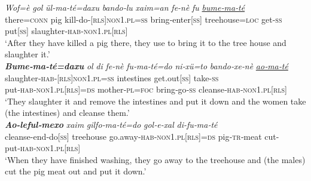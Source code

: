 \documentclass[output=paper]{LSP/langsci}
\begin{document}
\begin{exe}
\ex \label{Devex:09ac}
\begin{xlist}
\ex \label{Devex:09a}		
\gll \textit{Wof=è}  \textit{gol}  \textit{ül-ma‑té=daxu} \textit{bando‑lu} \textit{xaim=an} \textit{fe-nè} \textit{fu} \underline{\textit{bume‑ma‑té}}\\
there=\textsc{conn} pig kill-do‑\textsc{[rls]non1.pl=ss} bring‑enter[\textsc{ss}]  	treehouse=\textsc{loc} get-\textsc{ss} put[\textsc{ss}] slaughter‑\textsc{hab‑non1.pl[rls]}\\	
\glt `After they have killed a pig there, they use to bring it to the tree house and slaughter it.'\\

\ex \label{Devex:09b}		
\gll \textbf{\textit{Bume‑ma‑té=daxu}} \textit{ol} \textit{di} \textit{fe-nè} \textit{fu‑ma‑té=do} \textit{ni‑xü=to} \textit{bando‑xe‑nè} \textit{\underline{ao‑ma‑té}}\\
slaughter‑\textsc{hab‑[rls]non1.pl=ss} intestines get.out[\textsc{ss}] take-\textsc{ss} put‑\textsc{hab‑non1.pl[rls]=ds} mother‑\textsc{pl=foc} 	bring‑go‑\textsc{ss} cleanse‑\textsc{hab‑non1.pl[rls]}\\
\glt `They slaughter it and remove the intestines and put it down and the women take (the intestines) and cleanse them.'\\

\ex \label{Devex:09c}		
\gll \textbf{\textit{Ao-leful‑mexo}} \textit{xaim} \textit{gilfo‑ma‑té=do} \textit{gol‑e‑xal} \textit{di-fu‑ma‑té}\\
cleanse-end‑do[\textsc{ss}] treehouse go.away‑\textsc{hab‑non1.pl[rls]=ds} pig‑\textsc{tr}‑meat cut-put‑\textsc{hab‑non1.pl[rls]}\\
\glt `When they have finished washing, they go away to the treehouse and (the males) cut the pig meat out and put it down.'\\
\end{xlist}
\end{exe}
\end{document}

